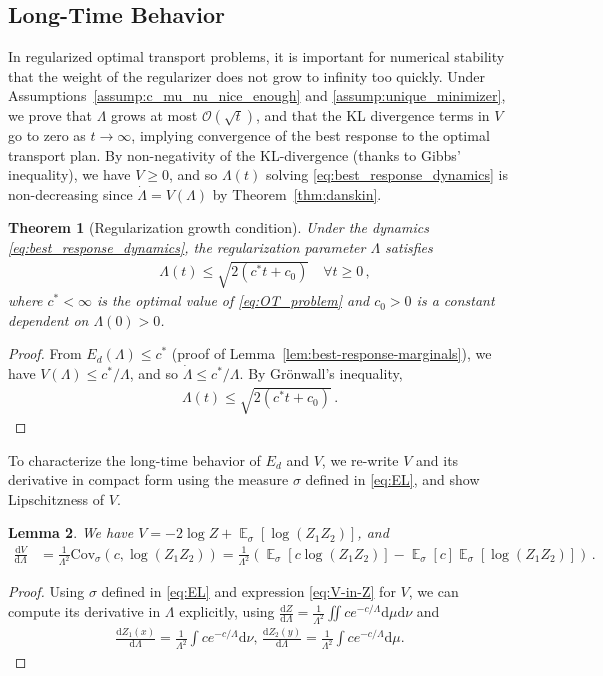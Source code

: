 \documentclass[11pt,a4paper,final]{article}
\newcommand{\mb}{\mathbb}
\DeclareMathOperator*{\E}{\mb{E}}
\renewcommand{\d}{\mathrm{d}}
\newcommand{\1}{\mathbf{1}}
\theoremstyle{plain}
\newtheorem{theorem}{Theorem}
\newtheorem{lemma}[theorem]{Lemma}
\numberwithin{equation}{section}
\numberwithin{theorem}{section}
\begin{document}
\subsection{Long-Time Behavior}\label{subsec:long_time_behavior}
In regularized optimal transport problems, it is important for numerical stability that the weight of the regularizer does not grow to infinity too quickly. Under Assumptions~\ref{assump:c_mu_nu_nice_enough} and \ref{assump:unique_minimizer}, we prove that $\Lambda$ grows at most $\mathcal O(\sqrt{t})$, and that the KL divergence terms in $V$ go to zero as $t\rightarrow \infty$, implying convergence of the best response to the optimal transport plan.
By non-negativity of the KL-divergence (thanks to Gibbs' inequality), we have $V\ge 0$, and so $\Lambda(t)$ solving \eqref{eq:best_response_dynamics} is non-decreasing since $\dot\Lambda=V(\Lambda)$ by Theorem~\ref{thm:danskin}.
\begin{theorem}[Regularization growth condition]\label{thm:Lambda-upper}
    Under the dynamics \eqref{eq:best_response_dynamics}, the regularization parameter $\Lambda$ satisfies
    \begin{align*}
        &\Lambda(t) \le \sqrt{2(c^* t + c_0)} \quad \forall t\ge 0\,,
    \end{align*}
    where $c^*<\infty$ is the optimal value of \eqref{eq:OT_problem} and $c_0>0$ is a constant dependent on $\Lambda(0)>0$.
\end{theorem}
\begin{proof}
From $E_d(\Lambda)\le c^*$ (proof of Lemma~\ref{lem:best-response-marginals}), we have $V(\Lambda)\le c^*/\Lambda$,
    and so $\dot \Lambda\le c^*/\Lambda$.
    By Gr\"onwall's inequality,
    \begin{align*}
        \Lambda(t) \le \sqrt{2(c^* t + c_0)}\,.
    \end{align*}
\end{proof}
To characterize the long-time behavior of $E_d$ and $V$, we re-write $V$ and its derivative in compact form using the measure $\sigma$ defined in \eqref{eq:EL}, and show Lipschitzness of $V$.
\begin{lemma}\label{lem:dV_dLambda} 
We have $V=-2\log Z +{\E}_\sigma[\log (Z_1 Z_2)]$,
 and 
 \begin{align*}
    \frac{\d V}{\d\Lambda}&=\frac{1}{\Lambda^2}\mathrm{Cov}_\sigma(c,\log(Z_1 Z_2))=\frac{1}{\Lambda^2} \left( {\E}_\sigma\left[c\log (Z_1 Z_2)\right]-{\E}_\sigma[c] {\E}_\sigma[\log (Z_1 Z_2)] \right)  \,.
\end{align*}
\end{lemma}
\begin{proof}
Using $\sigma$ defined in \eqref{eq:EL} and expression \eqref{eq:V-in-Z} for $V$, we can compute its derivative in $\Lambda$ explicitly, using $\frac{\d Z}{\d\Lambda}=\frac{1}{\Lambda^2} \iint c e^{-c/\Lambda}\d\mu\d\nu$ and
\begin{align*}
    \frac{\d Z_1(x)}{\d\Lambda}=\frac{1}{\Lambda^2} \int c e^{-c/\Lambda}\d\nu, \,
    \frac{\d Z_2(y)}{\d\Lambda}=\frac{1}{\Lambda^2} \int c e^{-c/\Lambda}\d\mu. 
\end{align*}
\end{proof}
\end{document}
